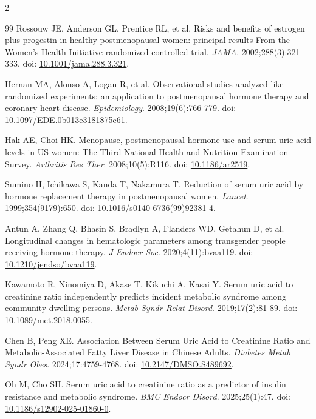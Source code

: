 \documentclass[10pt,letterpaper]{article}
\begin{document}
\begin{multicols}{2}
\begin{thebibliography}{99}
 Rossouw JE, Anderson GL, Prentice RL, et al. Risks and benefits of estrogen plus progestin in healthy postmenopausal women: principal results From the Women's Health Initiative randomized controlled trial. \textit{JAMA}. 2002;288(3):321-333. doi: \href{https://doi.org/10.1001/jama.288.3.321}{10.1001/jama.288.3.321}.

 Hernan MA, Alonso A, Logan R, et al. Observational studies analyzed like randomized experiments: an application to postmenopausal hormone therapy and coronary heart disease. \textit{Epidemiology}. 2008;19(6):766-779. doi: \href{https://doi.org/10.1097/EDE.0b013e3181875e61}{10.1097/EDE.0b013e3181875e61}.

 Hak AE, Choi HK. Menopause, postmenopausal hormone use and serum uric acid levels in US women: The Third National Health and Nutrition Examination Survey. \textit{Arthritis Res Ther}. 2008;10(5):R116. doi: \href{https://doi.org/10.1186/ar2519}{10.1186/ar2519}.

 Sumino H, Ichikawa S, Kanda T, Nakamura T. Reduction of serum uric acid by hormone replacement therapy in postmenopausal women. \textit{Lancet}. 1999;354(9179):650. doi: \href{https://doi.org/10.1016/s0140-6736(99)92381-4}{10.1016/s0140-6736(99)92381-4}.

 Antun A, Zhang Q, Bhasin S, Bradlyn A, Flanders WD, Getahun D, et al. Longitudinal changes in hematologic parameters among transgender people receiving hormone therapy. \textit{J Endocr Soc}. 2020;4(11):bvaa119. doi: \href{https://doi.org/10.1210/jendso/bvaa119}{10.1210/jendso/bvaa119}.

 Kawamoto R, Ninomiya D, Akase T, Kikuchi A, Kasai Y. Serum uric acid to creatinine ratio independently predicts incident metabolic syndrome among community-dwelling persons. \textit{Metab Syndr Relat Disord}. 2019;17(2):81-89. doi: \href{https://doi.org/10.1089/met.2018.0055}{10.1089/met.2018.0055}.

 Chen B, Peng XE. Association Between Serum Uric Acid to Creatinine Ratio and Metabolic-Associated Fatty Liver Disease in Chinese Adults. \textit{Diabetes Metab Syndr Obes}. 2024;17:4759-4768. doi: \href{https://doi.org/10.2147/DMSO.S489692}{10.2147/DMSO.S489692}.

 Oh M, Cho SH. Serum uric acid to creatinine ratio as a predictor of insulin resistance and metabolic syndrome. \textit{BMC Endocr Disord}. 2025;25(1):47. doi: \href{https://doi.org/10.1186/s12902-025-01860-0}{10.1186/s12902-025-01860-0}.


\end{thebibliography}
\end{multicols}
\end{document}
